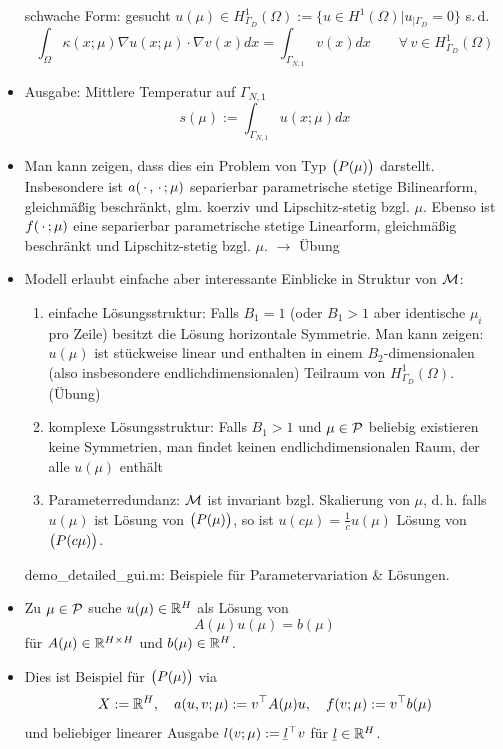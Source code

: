 \begin{bsp}
\begin{itemize}
	schwache Form: gesucht $u(\mu) \in H^1_{\Gamma_D}(\Omega) := \{u \in H^1(\Omega) | u_{|\Gamma_D}=0\}$ s.\,d.
	\[
		\int_{\Omega} \kappa(x;\mu) \nabla u(x;\mu) \cdot \nabla v(x) dx = \int_{\Gamma_{N,1}} v(x) dx \qquad \forall \, v \in H^1_{\Gamma_D}(\Omega)
	\]
	\item Ausgabe: Mittlere Temperatur auf $\Gamma_{N,1}$
	\[
		s(\mu) := \int_{\Gamma_{N,1}} u(x;\mu) dx
	\]
	\item Man kann zeigen, dass dies ein Problem von Typ $\prob$ darstellt. Insbesondere ist $a(\pdot,\pdot;\mu)$ separierbar parametrische stetige Bilinearform, gleichmäßig beschränkt, glm. koerziv und Lipschitz-stetig bzgl. $\mu$. Ebenso ist $f(\pdot;\mu)$ eine separierbar parametrische stetige Linearform, gleichmäßig beschränkt und Lipschitz-stetig bzgl. $\mu$. $\rightarrow$ Übung
	\item Modell erlaubt einfache aber interessante Einblicke in Struktur von $\LM$:
	\begin{enumerate}[1.]
		\item einfache Lösungsstruktur: Falls $B_1 =1$ (oder $B_1>1$ aber identische $\mu_i$ pro Zeile) besitzt die Lösung horizontale Symmetrie. Man kann zeigen: $u(\mu)$ ist stückweise linear und enthalten in einem $B_2$-dimensionalen (also insbesondere endlichdimensionalen) Teilraum von $H^1_{\Gamma_D}(\Omega)$. (Übung)
		\item komplexe Lösungsstruktur: Falls $B_1>1$ und $\mu \in \p$ beliebig existieren keine Symmetrien, man findet keinen endlichdimensionalen Raum, der alle $u(\mu)$ enthält
		\item Parameterredundanz: $\LM$ ist invariant bzgl. Skalierung von $\mu$, d.\,h. falls $u(\mu)$ ist Lösung von $\prob$, so ist $u(c\mu) = \frac{1}{c}u(\mu)$ Lösung von $\prob[c\mu]$.
	\end{enumerate}
	\textsf{demo\_detailed\_gui.m}: Beispiele für Parametervariation \& Lösungen. 
\end{itemize}
\end{bsp}

\begin{bsp}[Matrixgleichung] \beginwithlist
	\begin{itemize}
		\item Zu $\mu \in \p$ suche $u(\mu) \in \R^H$ als Lösung von
			\[
				A(\mu) u(\mu) = b(\mu)
			\]
			für $A(\mu) \in \R^{H \times H}$ und $b(\mu) \in \R^H$.
		\item Dies ist Beispiel für $\prob$ via
			\[
				X := \R^H, \quad a(u,v;\mu) := v^\top A(\mu) u, \quad f(v;\mu) := v^\top b(\mu)
			\]
			und beliebiger linearer Ausgabe $l(v;\mu) := \ubar l^\top v$ für $\ubar l \in \R^H$.
	\end{itemize}
\end{bsp}

